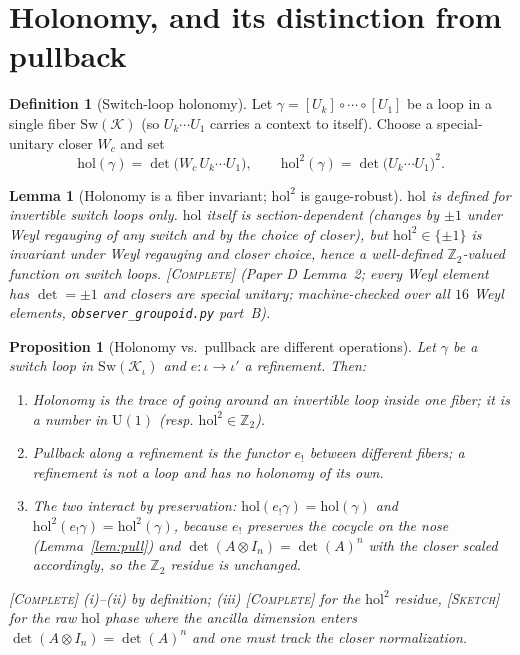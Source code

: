 \documentclass[11pt]{article}
\newtheorem{lemma}{Lemma}
\newtheorem{proposition}{Proposition}
\theoremstyle{definition}
\newtheorem{definition}{Definition}
\theoremstyle{remark}
\newcommand{\K}{\mathcal K}
\newcommand{\Sw}{\mathrm{Sw}}
\newcommand{\U}{\mathrm{U}}
\newcommand{\hol}{\mathrm{hol}}
\newcommand{\Zt}{\mathbb Z_2}
\newcommand{\pushf}[1]{{#1}_{!}}
\newcommand{\STC}{{\normalfont\textsc{[Complete]}}}
\newcommand{\STS}{{\normalfont\textsc{[Sketch]}}}
\begin{document}
\section{Holonomy, and its distinction from pullback}\label{sec:holonomy}

\begin{definition}[Switch-loop holonomy]\label{def:hol}
Let $\gamma=[U_k]\circ\cdots\circ[U_1]$ be a loop in a single fiber $\Sw(\K)$ (so
$U_k\cdots U_1$ carries a context to itself). Choose a special-unitary closer $W_c$ and
set
\[
\hol(\gamma)=\det\!\bigl(W_c\,U_k\cdots U_1\bigr),\qquad
\hol^2(\gamma)=\det\!\bigl(U_k\cdots U_1\bigr)^2 .
\]
\end{definition}

\begin{lemma}[Holonomy is a fiber invariant; $\hol^2$ is gauge-robust]\label{lem:holinv}
$\hol$ is defined for invertible switch loops only. $\hol$ itself is section-dependent
(changes by $\pm1$ under Weyl regauging of any switch and by the choice of closer), but
$\hol^2\in\{\pm1\}$ is invariant under Weyl regauging and closer choice, hence a
well-defined $\Zt$-valued function on switch loops. \STC{} (Paper D
Lemma~2; every Weyl element has $\det=\pm1$ and closers are special unitary;
machine-checked over all $16$ Weyl elements, \texttt{observer\_groupoid.py} part~B).
\end{lemma}

\begin{proposition}[Holonomy vs.\ pullback are different operations]\label{prop:holvspull}
Let $\gamma$ be a switch loop in $\Sw(\K_\iota)$ and $e:\iota\to\iota'$ a refinement.
Then:
\begin{enumerate}[label=(\roman*),leftmargin=2em]
\item \emph{Holonomy} is the trace of going \emph{around an invertible loop inside one
fiber}; it is a number in $\U(1)$ (resp. $\hol^2\in\Zt$).
\item \emph{Pullback along a refinement} is the functor $\pushf e$ \emph{between
different fibers}; a refinement is not a loop and has no holonomy of its own.
\item The two interact by \emph{preservation}: $\hol(\pushf e\gamma)=\hol(\gamma)$ and
$\hol^2(\pushf e\gamma)=\hol^2(\gamma)$, because $\pushf e$ preserves the cocycle on the
nose (Lemma~\ref{lem:pull}) and $\det(A\otimes I_n)=\det(A)^n$ with the closer
scaled accordingly, so the $\Zt$ residue is unchanged.
\end{enumerate}
\STC{} (i)--(ii) by definition; (iii) \STC{} for the $\hol^2$ residue, \STS{} for the
raw $\hol$ phase where the ancilla dimension enters $\det(A\otimes I_n)=\det(A)^n$ and
one must track the closer normalization.
\end{proposition}
\end{document}
